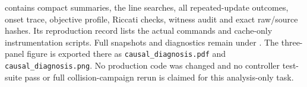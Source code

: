 \documentclass[11pt]{article}
\begin{document}
 contains compact summaries, the
line searches, all repeated-update outcomes, onset trace, objective profile,
Riccati checks, witness audit and exact raw/source hashes. Its reproduction
record lists the actual commands and cache-only instrumentation scripts.
Full snapshots and diagnostics remain under
.
The three-panel figure is exported there as \texttt{causal\_diagnosis.pdf}
and \texttt{causal\_diagnosis.png}. No production code was changed and no
controller test-suite pass or full collision-campaign rerun is claimed for
this analysis-only task.
\end{document}

